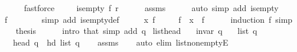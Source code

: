 \begin{isabellebody}
\ \ \ \ \isamarkupfalse%
\ fastforce\isanewline
\ \ \isamarkupfalse%
\ {\isachardoublequoteopen}{\isasymnot}\ is{\isacharunderscore}{\kern0pt}empty\ {\isacharparenleft}{\kern0pt}f{\isacharcomma}{\kern0pt}\ r{\isacharparenright}{\kern0pt}{\isachardoublequoteclose}\isanewline
\ \ \ \ \isamarkupfalse%
\ assms\isanewline
\ \ \ \ \isamarkupfalse%
\ {\isacharparenleft}{\kern0pt}auto\ simp\ add{\isacharcolon}{\kern0pt}\ is{\isacharunderscore}{\kern0pt}empty{\isacharparenright}{\kern0pt}\isanewline
\ \ \isamarkupfalse%
\ {\isachardoublequoteopen}f\ {\isasymnoteq}\ {\isacharbrackleft}{\kern0pt}{\isacharbrackright}{\kern0pt}{\isachardoublequoteclose}\isanewline
\ \ \ \ \isamarkupfalse%
\ {\isacharparenleft}{\kern0pt}simp\ add{\isacharcolon}{\kern0pt}\ is{\isacharunderscore}{\kern0pt}empty{\isacharunderscore}{\kern0pt}def{\isacharparenright}{\kern0pt}\isanewline
\ \ \isamarkupfalse%
\ \isamarkupfalse%
\ x\ f{\isacharprime}{\kern0pt}\ \isanewline
\ \ \ \ {\isachardoublequoteopen}f\ {\isacharequal}{\kern0pt}\ x\ {\isacharhash}{\kern0pt}\ f{\isacharprime}{\kern0pt}{\isachardoublequoteclose}\isanewline
\ \ \ \ \isamarkupfalse%
\ {\isacharparenleft}{\kern0pt}induction\ f{\isacharparenright}{\kern0pt}\ simp{\isacharplus}{\kern0pt}\isanewline
\ \ \isamarkupfalse%
\ {\isacharquery}{\kern0pt}thesis\isanewline
\ \ \ \ \isamarkupfalse%
\ {\isacharparenleft}{\kern0pt}intro\ that{\isacharparenright}{\kern0pt}\ {\isacharparenleft}{\kern0pt}simp\ add{\isacharcolon}{\kern0pt}\ q{\isacharparenright}{\kern0pt}\isanewline
{}\isamarkupfalse%
%
\endisatagproof
{\isafoldproof}%
%
\isadelimproof
\isanewline
%
\endisadelimproof
\isanewline
{}\isamarkupfalse%
\ list{\isacharunderscore}{\kern0pt}head{\isacharcolon}{\kern0pt}\isanewline
\ \ \ {\isachardoublequoteopen}invar\ q{\isachardoublequoteclose}\isanewline
\ \ \ {\isachardoublequoteopen}list\ q\ {\isasymnoteq}\ {\isacharbrackleft}{\kern0pt}{\isacharbrackright}{\kern0pt}{\isachardoublequoteclose}\isanewline
\ \ \ {\isachardoublequoteopen}head\ q\ {\isacharequal}{\kern0pt}\ hd\ {\isacharparenleft}{\kern0pt}list\ q{\isacharparenright}{\kern0pt}{\isachardoublequoteclose}\isanewline
%
\isadelimproof
\ \ %
\endisadelimproof
%
\isatagproof
{}\isamarkupfalse%
\ assms\isanewline
\ \ \isamarkupfalse%
\ {\isacharparenleft}{\kern0pt}auto\ elim{\isacharcolon}{\kern0pt}\ list{\isacharunderscore}{\kern0pt}non{\isacharunderscore}{\kern0pt}emptyE{\isacharparenright}{\kern0pt}%

\end{isabellebody}
